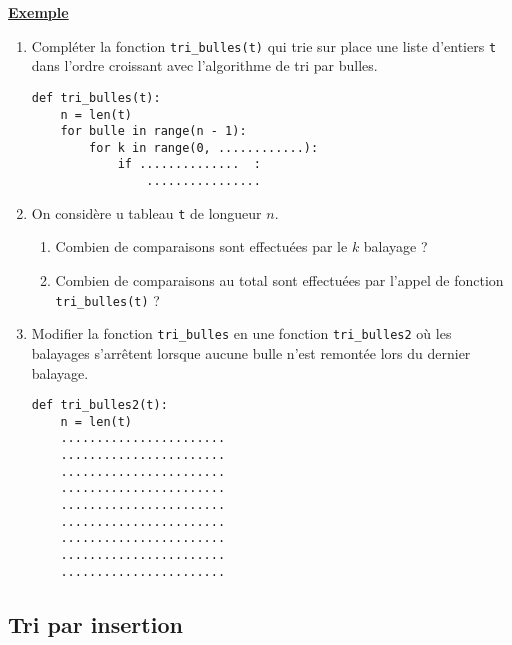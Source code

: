 \documentclass[a4paper, french, 12pt]{article}  %
\newcounter{thme}
\newcounter{def}
\newcounter{exple}
\newenvironment{exemple}[1]
{\par \medskip  \noindent \addtocounter{exple}{1} \underline{\textbf{Exemple} \textbf{\theexple} } \hspace{0.5cm}{\itshape #1} \vspace*{10pt} \par}
{\par \medskip }
\newcounter{alg}
\newlength{\parpointille}
\newcommand{\Pointilles}[2]{%
\multido{}{#1}{%
\makebox[#2]{\dotfill}\\[\parpointille]
}}
\begin{document}
\begin{exemple}{Implémentation du tri par bulles}

\begin{enumerate}
	
	\item Compléter la fonction \verb+tri_bulles(t)+ qui trie sur place une liste d'entiers \verb+t+ dans l'ordre croissant avec l'algorithme de tri par bulles.
	
	
	\begin{lstlisting}
def tri_bulles(t):
	n = len(t)
	for bulle in range(n - 1):
		for k in range(0, ............):
			if ..............  :
				................
	\end{lstlisting}
	
	\item On considère u tableau \verb+t+ de longueur $n$. 
		\begin{enumerate}
			\item 	Combien de comparaisons sont effectuées par le  $k$ balayage   ?
			
			\Pointilles{2}{\linewidth}
			
			\item Combien de comparaisons au total sont effectuées par l'appel de fonction \verb+tri_bulles(t)+ ?
			
			\Pointilles{4}{\linewidth}
			
		\end{enumerate}
		
		\newpage
		
	\item Modifier la fonction \verb+tri_bulles+ en une fonction \verb+tri_bulles2+ où les balayages s'arrêtent  
	lorsque aucune \og{} bulle \fg{} n'est remontée lors du dernier balayage.
	
	\medskip
	
		\begin{lstlisting}
def tri_bulles2(t):
	n = len(t)
	.......................
	.......................
	.......................
	.......................
	.......................
	.......................
	.......................
	.......................
	.......................
	\end{lstlisting}
	
	
	
\end{enumerate}

\end{exemple}


\subsection{Tri par insertion}
\end{document}
